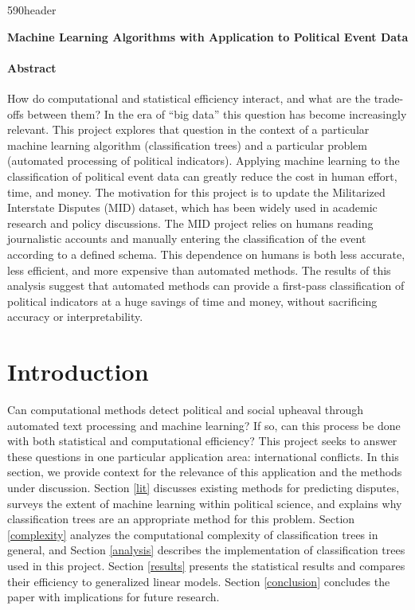 \documentclass[12pt,letterpaper]{article}
\begin{document}
\cps590header

\vspace{1in}
\begin{center}
\textbf{Machine Learning Algorithms with Application to Political Event Data}
\end{center}

\vspace{1in}
\paragraph{Abstract} How do computational and statistical efficiency interact, and what are the trade-offs between them? In the era of ``big data'' this question has become increasingly relevant. This project explores that question in the context of a particular machine learning algorithm (classification trees) and a particular problem (automated processing of political indicators). Applying machine learning to the classification of political event data can greatly reduce the cost in human effort, time, and money. The motivation for this project is to update the Militarized Interstate Disputes (MID) dataset, which has been widely used in academic research and policy discussions. The MID project relies on humans reading journalistic accounts and manually entering the classification of the event according to a defined schema. This dependence on humans is both less accurate, less efficient, and more expensive than automated methods. The results of this analysis suggest that automated methods can provide a first-pass classification of political indicators at a huge savings of time and money, without sacrificing accuracy or interpretability. 


\pagebreak
\doublespacing

\section{Introduction} %

Can computational methods detect political and social upheaval through automated text processing and machine learning? If so, can this process be done with both statistical and computational efficiency? This project seeks to answer these questions in one particular application area: international conflicts. In this section, we provide context for the relevance of this application and the methods under discussion. Section \ref{lit} discusses existing methods for predicting disputes, surveys the extent of machine learning within political science, and explains why classification trees are an appropriate method for this problem. Section \ref{complexity} analyzes the computational complexity of classification trees in general, and Section \ref{analysis} describes the implementation of classification trees used in this project. Section \ref{results} presents the statistical results and compares their efficiency to generalized linear models. Section \ref{conclusion} concludes the paper with implications for future research. 
\end{document}
